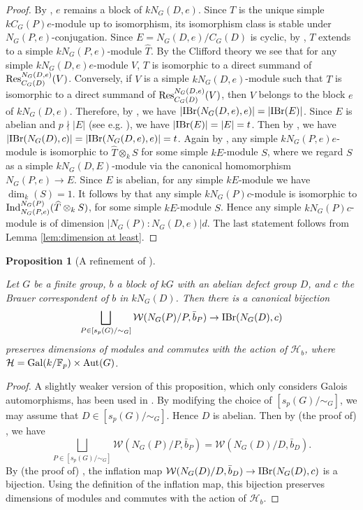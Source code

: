 \documentclass[preprint,12pt,3p]{elsarticle}
\newtheorem{proposition}[theorem]{Proposition}%
\def\IBr{{\rm IBr}}
\def\Ind{{\rm Ind}}
\def\Res{{\rm Res}}
\def\Aut{{\rm Aut}}
\def\Gal{{\rm Gal}}
\def\W{\mathcal{W}}
\def\H{\mathcal{H}}
\def\F{\mathbb{F}}
\begin{document}
\begin{proof}
By \cite[Theorem 6.2.6 (iii)]{Lin18b}, $e$ remains a block of $kN_G(D,e)$. Since $T$ is the unique simple $k C_G(P) e$-module up to isomorphism, its isomorphism class is stable under $N_G(P,e)$-conjugation. Since $E=N_G(D,e)/C_G(D)$ is cyclic, by \cite[Theorem 8.12]{Navarro}, $T$ extends to a simple $kN_G(P,e)$-module $\widehat{T}$.  By the Clifford theory we see that for any simple $kN_G(D,e)e$-module $V$, $T$ is isomorphic to a direct summand of $\Res_{C_G(D)}^{N_G(D,e)}(V)$. Conversely, if $V$ is a simple $kN_G(D,e)$-module such that $T$ is isomorphic to a direct summand of $\Res_{C_G(D)}^{N_G(D,e)}(V)$, then $V$ belongs to the block $e$ of $kN_G(D,e)$. Therefore, by \cite[Corollary 8.20]{Navarro}, we have $|\IBr(N_G(D,e),e)|=|\IBr(E)|$. Since $E$ is abelian and $p\nmid |E|$ (see e.g. \cite[Theorem 6.7.6 (v)]{Lin18b}), we have $|\IBr(E)|=|E|=t$. Then by \cite[Theorem 6.7.6 (iii)]{Lin18b}, we have $|\IBr(N_G(D),c)|=|\IBr(N_G(D,e),e)|=t$. Again by \cite[Corollary 8.20]{Navarro}, any simple $k N_G(P,e)e$-module is isomorphic to $\widehat{T} \otimes_k S$ for some simple $kE$-module $S$, where we regard $S$ as a simple $kN_G(D,E)$-module via the canonical homomorphism $N_G(P,e)\to E$. Since $E$ is abelian, for any simple $kE$-module we have $\dim_k(S)=1$. It follows by \cite[Theorem 6.7.6 (iii)]{Lin18b} that any simple $k N_G(P)c$-module is isomorphic to $\Ind_{N_G(P,e)}^{N_G(P)}(\widehat{T} \otimes_k S)$, for some simple $kE$-module $S$. Hence any simple $kN_G(P)c$-module is of dimension $|N_G(P):N_G(D,e)|d$. The last statement follows from Lemma \ref{lem:dimension at least}.
\end{proof}


\begin{proposition}[A refinement of {\cite[Consequences 1, 2]{Alp}}]\label{lem:c and weight}


Let $G$ be a finite group, $b$ a block of $kG$ with an abelian defect group $D$, and $c$ the Brauer correspondent of $b$ in $kN_G(D)$. Then there is a canonical bijection 
$$\bigsqcup_{P\in [s_p(G)/\sim_G]}\W(N_G(P)/P,\bar{b}_P)\to \IBr(N_G(D),c)$$ 
preserves dimensions of modules and commutes with the action of $\H_b$, where $\H=\Gal(k/\F_p)\times \Aut(G)$.
\end{proposition}	

\begin{proof}
A slightly weaker version of this proposition, which only considers Galois automorphisms, has been used in \cite[page 324]{HY}. By modifying the choice of $[s_p(G)/\sim_G]$, we may assume that $D\in [s_p(G)/\sim_G]$. Hence $D$ is abelian. Then by (the proof of) \cite[Consequence 2]{Alp}, we have
$$\bigsqcup_{P\in [s_p(G)/\sim_G]}\W(N_G(P)/P,\bar{b}_P)=\W(N_G(D)/D,\bar{b}_D).$$
By (the proof of) \cite[Consequence 1]{Alp}, the inflation map $\W(N_G(D)/D,\bar{b}_D)\to \IBr(N_G(D),c)$ is a bijection. Using the definition of the inflation map, this bijection preserves dimensions of modules and commutes with the action of $\H_b$.
\end{proof}
\end{document}
